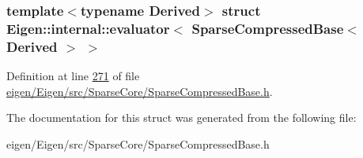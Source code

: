 \subsubsection*{template$<$typename Derived$>$\newline
struct Eigen\+::internal\+::evaluator$<$ Sparse\+Compressed\+Base$<$ Derived $>$ $>$}



Definition at line \hyperlink{eigen_2_eigen_2src_2_sparse_core_2_sparse_compressed_base_8h_source_l00271}{271} of file \hyperlink{eigen_2_eigen_2src_2_sparse_core_2_sparse_compressed_base_8h_source}{eigen/\+Eigen/src/\+Sparse\+Core/\+Sparse\+Compressed\+Base.\+h}.



The documentation for this struct was generated from the following file\+:\begin{DoxyCompactItemize}
\item 
eigen/\+Eigen/src/\+Sparse\+Core/\+Sparse\+Compressed\+Base.\+h\end{DoxyCompactItemize}
